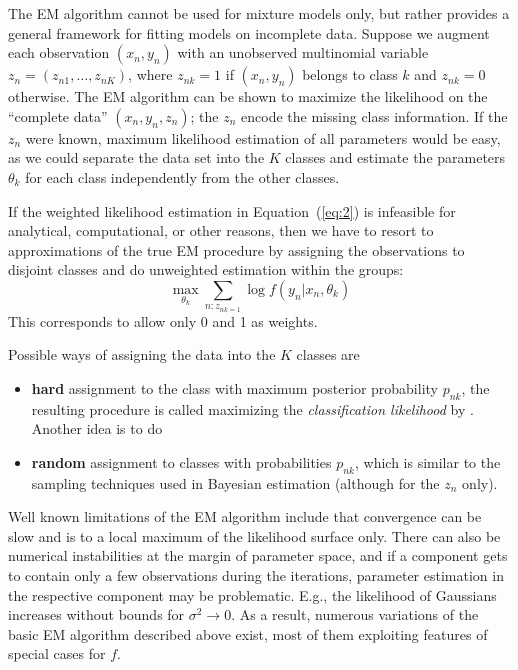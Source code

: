 \documentclass{jss}
\begin{document}
The EM algorithm cannot be used for mixture models only, but rather
provides a general framework for fitting models on incomplete data.
Suppose we augment each observation $(x_n,y_n)$ with an unobserved
multinomial variable $z_n = (z_{n1},\ldots,z_{nK})$, where $z_{nk}=1$
if $(x_n,y_n)$ belongs to class $k$ and $z_{nk}=0$ otherwise. The EM
algorithm can be shown to maximize the likelihood on the ``complete
data'' $(x_n,y_n,z_n)$;  the $z_n$ encode the missing class
information. If the $z_n$ were known, maximum likelihood estimation of
all parameters would be easy, as we could separate the data set into
the $K$ classes and estimate the parameters $\theta_k$ for each class
independently from the other classes.

If the weighted likelihood estimation in Equation~(\ref{eq:2}) is
infeasible for analytical, computational, or other reasons, then we
have to resort to approximations of the true EM procedure by assigning
the observations to disjoint classes and do unweighted estimation
within the groups:
\begin{displaymath}
  \max_{\theta_k} \sum_{n: z_{nk=1}} \log f(y_n | x_n, \theta_k)  
\end{displaymath}
This corresponds to allow only 0 and 1 as weights.

Possible ways of assigning the data into the $K$ classes are
\begin{itemize}
 \item \textbf{hard} \label{hard} assignment to the class with maximum
  posterior probability $p_{nk}$, the resulting procedure is called
  maximizing the \emph{classification likelihood} by
  \cite{fla:Fraley+Raftery:2002}. Another idea is to do
 \item \textbf{random} assignment to classes with probabilities
  $p_{nk}$, which is similar to the sampling techniques used in
  Bayesian estimation (although for the $z_n$ only).
\end{itemize}

Well known limitations of the EM algorithm include that convergence
can be slow and is to a local maximum of the likelihood surface only.
There can also be numerical instabilities at the margin of parameter
space, and if a component gets to contain only a few observations
during the iterations, parameter estimation in the respective
component may be problematic.  E.g., the likelihood of Gaussians
increases without bounds for $\sigma^2\to 0$. As a result, numerous
variations of the basic EM algorithm described above exist, most of
them exploiting features of special cases for $f$.
\end{document}
